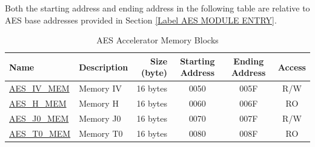 Both the starting address and ending address in the following table are relative to AES base addresses provided in Section \ref{Label AES MODULE ENTRY}.

\begin{longtable}{ | p{3cm} | p{3cm} | r | c | c | c | }
\caption{AES Accelerator Memory Blocks} \label{table:AES-Memory-Blocks}
\\ \hline
\rowcolor{lightgray}
Name & Description  &  Size (byte)  &  Starting Address  &  Ending Address  & Access   \\ \hline
{\hyperref[memdesc:AESIVMEM]{AES\_IV\_MEM}} & Memory IV & 16 bytes  & \hexprefix{}0050 & \hexprefix{}005F & R/W \\ \hline
{\hyperref[memdesc:AESHMEM]{AES\_H\_MEM}}  & Memory H  & 16 bytes  & \hexprefix{}0060 & \hexprefix{}006F & RO  \\ \hline
{\hyperref[memdesc:AESJ0MEM]{AES\_J0\_MEM}} & Memory J0 & 16 bytes  & \hexprefix{}0070 & \hexprefix{}007F & R/W \\ \hline
{\hyperref[memdesc:AEST0MEM]{AES\_T0\_MEM}} & Memory T0 & 16 bytes  & \hexprefix{}0080 & \hexprefix{}008F & RO  \\ \hline
\end{longtable}
